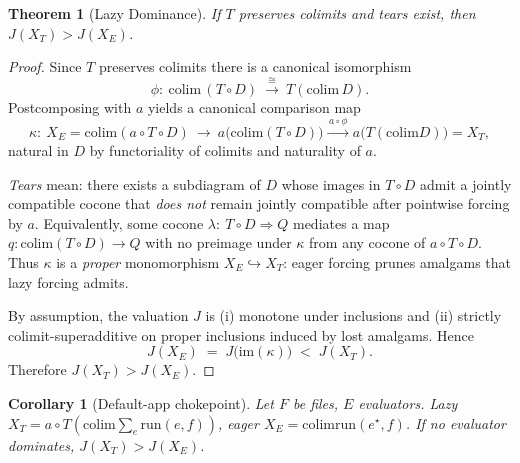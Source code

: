\documentclass[12pt]{article}
\newtheorem{theorem}{Theorem}
\newtheorem{corollary}{Corollary}
\theoremstyle{remark}
\begin{document}
\begin{theorem}[Lazy Dominance]
If $T$ preserves colimits and tears exist, then $J(X_T) > J(X_E)$.
\end{theorem}

\begin{proof}
Since $T$ preserves colimits there is a canonical isomorphism
\[
\phi:\ \mathrm{colim}\,(T\circ D)\ \xrightarrow{\ \cong\ }\ T(\mathrm{colim}\,D).
\]
Postcomposing with $a$ yields a canonical comparison map
\[
\kappa:\ X_E=\mathrm{colim}(a\circ T\circ D)\ \longrightarrow\
a\big(\mathrm{colim}(T\circ D)\big)\xrightarrow{\,a\circ \phi\,} a\big(T(\mathrm{colim} D)\big)=X_T,
\]
natural in $D$ by functoriality of colimits and naturality of $a$.

\emph{Tears} mean: there exists a subdiagram of $D$ whose images in $T\circ D$ admit a jointly compatible cocone that \emph{does not} remain jointly compatible after pointwise forcing by $a$.
Equivalently, some cocone $\lambda:\ T\circ D \Rightarrow Q$ mediates a map $q:\mathrm{colim}(T\circ D)\to Q$ with no preimage under $\kappa$ from any cocone of $a\circ T\circ D$.
Thus $\kappa$ is a \emph{proper} monomorphism $X_E \hookrightarrow X_T$: eager forcing prunes amalgams that lazy forcing admits.

By assumption, the valuation $J$ is (i) monotone under inclusions and (ii) strictly colimit-superadditive on proper inclusions induced by lost amalgams.
Hence
\[
J(X_E)\;=\;J\big(\mathrm{im}(\kappa)\big)\;<\;J(X_T).
\]
Therefore $J(X_T) > J(X_E)$.
\end{proof}


\begin{corollary}[Default-app chokepoint]
Let $F$ be files, $E$ evaluators. Lazy $X_T = a \circ T(\mathrm{colim} \sum_e \mathrm{run}(e,f))$, eager $X_E = \mathrm{colim} \mathrm{run}(e^\star,f)$. If no evaluator dominates, $J(X_T) > J(X_E)$.
\end{corollary}
\end{document}
